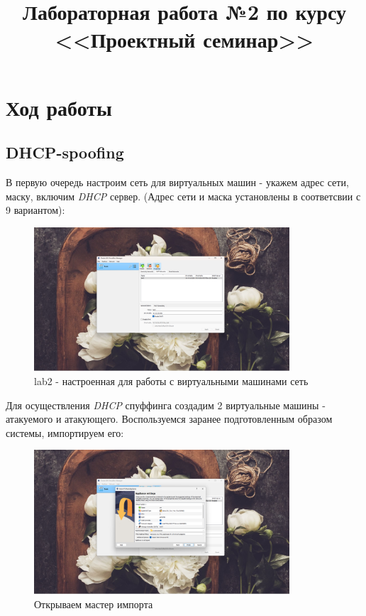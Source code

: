 \documentclass[a4paper]{article}
\title{
  Лабораторная работа №2 по курсу \\
  <<Проектный семинар>>  
}
\begin{document}
  \templatedtitlepage
  
  \toc
  \section{Ход работы}

  \subsection{DHCP-spoofing}

  В первую очередь настроим сеть для виртуальных машин - укажем адрес сети, маску, включим \textit{DHCP} сервер.
  (Адрес сети и маска установлены в соответсвии с 9 вариантом):

  \begin{figure}[H]
    \centering
    \includegraphics[width=0.85\textwidth]{02_00 (1)}
    \caption{lab2 - настроенная для работы с виртуальными машинами сеть}
    \label{img:0001}
  \end{figure}

  Для осуществления \textit{DHCP} спуффинга создадим 2 виртуальные машины - атакуемого и атакующего.
  Воспользуемся заранее подготовленным образом системы, импортируем его:

  \begin{figure}[H]
    \centering
    \includegraphics[width=0.85\textwidth]{02_00 (2)}
    \caption{Открываем мастер импорта}
    \label{img:0002}
  \end{figure}
\end{document}
